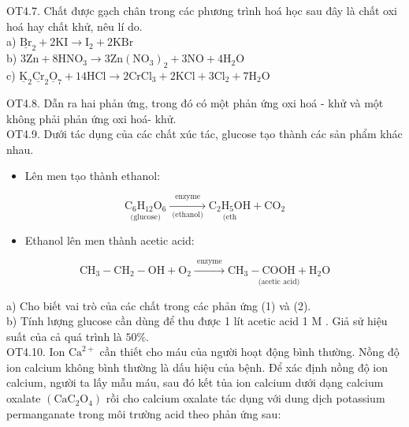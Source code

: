 \documentclass[10pt]{article}
\begin{document}
OT4.7. Chất được gạch chân trong các phương trình hoá học sau đây là chất oxi hoá hay chất khử, nêu lí do.\\
a) $\underline{\mathrm{Br}}_{2}+2 \mathrm{KI} \rightarrow \mathrm{I}_{2}+2 \mathrm{KBr}$\\
b) $3 \mathrm{Zn}+8 \mathrm{HNO}_{3} \rightarrow 3 \mathrm{Zn}\left(\mathrm{NO}_{3}\right)_{2}+3 \mathrm{NO}+4 \mathrm{H}_{2} \mathrm{O}$\\
c) $\underline{\mathrm{K}}_{2} \underline{\mathrm{Cr}}_{2} \underline{\mathrm{O}}_{7}+14 \mathrm{HCl} \rightarrow 2 \mathrm{CrCl}_{3}+2 \mathrm{KCl}+3 \mathrm{Cl}_{2}+7 \mathrm{H}_{2} \mathrm{O}$

OT4.8. Dẫn ra hai phản ứng, trong đó có một phản ứng oxi hoá - khử và một không phải phản ứng oxi hoá- khử.\\
OT4.9. Dưới tác dụng của các chất xúc tác, glucose tạo thành các sản phẩm khác nhau.

\begin{itemize}
  \item Lên men tạo thành ethanol:
\end{itemize}


\begin{equation*}
\underset{\text { (glucose) }}{\mathrm{C}_{6} \mathrm{H}_{12} \mathrm{O}_{6}} \xrightarrow[\text { (ethanol) }]{\text { enzyme }} \underset{\text { (eth }}{\mathrm{C}_{2} \mathrm{H}_{5} \mathrm{OH}}+\mathrm{CO}_{2} \tag{1}
\end{equation*}


\begin{itemize}
  \item Ethanol lên men thành acetic acid:
\end{itemize}


\begin{equation*}
\mathrm{CH}_{3}-\mathrm{CH}_{2}-\mathrm{OH}+\mathrm{O}_{2} \xrightarrow{\text { enzyme }} \underset{\text { (acetic acid) }}{\mathrm{CH}_{3}-\mathrm{COOH}+\mathrm{H}_{2} \mathrm{O}} \tag{2}
\end{equation*}


a) Cho biết vai trò của các chất trong các phản ứng (1) và (2).\\
b) Tính lượng glucose cần dùng để thu được 1 lít acetic acid 1 M . Giả sử hiệu suất của cả quá trình là $50 \%$.\\
OT4.10. Ion $\mathrm{Ca}^{2+}$ cần thiết cho máu của người hoạt động bình thường. Nồng độ ion calcium không bình thường là dấu hiệu của bệnh. Để xác định nồng độ ion calcium, người ta lấy mẫu máu, sau đó kết tủa ion calcium dưới dạng calcium oxalate $\left(\mathrm{CaC}_{2} \mathrm{O}_{4}\right)$ rồi cho calcium oxalate tác dụng với dung dịch potassium permanganate trong môi trường acid theo phản ứng sau:
\end{document}
